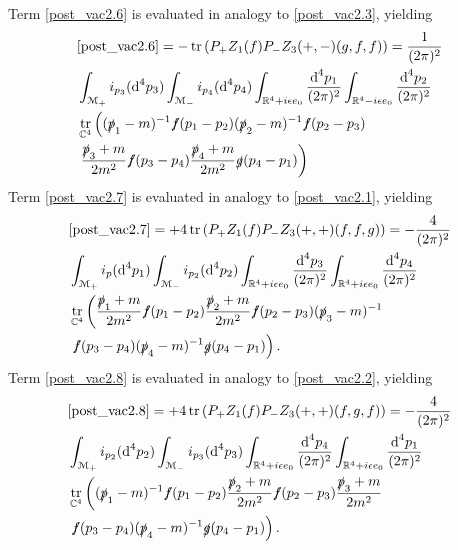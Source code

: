 \documentclass[oneside,reqno,12pt]{amsart}
\DeclareMathOperator{\tr}{tr}
\begin{document}
Term \eqref{post_vac2.6} is evaluated in analogy to \eqref{post_vac2.3}, yielding
\begin{align*}
&\eqref{post_vac2.6}=- \tr\left(P_+ Z_1(f)P_- Z_3(+,-)(g,f,f)\right)=\frac{1}{(2\pi)^2}\\
&\int_{\mathcal{M_+}}  i_{p_3}(\text{d}^4p_{3}) 
\int_{\mathcal{M_-}}  i_{p_4}(\text{d}^4p_{4})
\int_{\mathbb{R}^4+i \epsilon e_0}\frac{\text{d}^4p_1}{(2\pi)^{2}}
\int_{\mathbb{R}^4-i \epsilon e_0}\frac{\text{d}^4p_2}{(2\pi)^{2}}
 \\
&\tr_{\mathbb{C}^4}\left( (\slashed{p}_1-m)^{-1}  \slashed{f}(p_{1}-p_2)  (\slashed{p}_2-m)^{-1} \slashed{f}(p_{2}-p_{3})   \right.\\
&\left.  \frac{\slashed{p}_3+m}{2m^2} \slashed{f}(p_{3}-p_{4})
 \frac{\slashed{p}_{4}+m}{2m^2} 
\slashed{g}(p_{4}-p_1)  \right)
\end{align*}
Term \eqref{post_vac2.7} is evaluated in analogy to \eqref{post_vac2.1}, yielding
\begin{align*}
&\eqref{post_vac2.7}=+4 \tr\left(P_+ Z_1(f)P_- Z_3(+,+)(f,f,g)\right)=-\frac{4}{(2\pi)^2}\\
&\int_{\mathcal{M_+}}  i_p(\text{d}^4p_{1}) 
\int_{\mathcal{M_-}}  i_{p_2}(\text{d}^4p_{2})
\int_{\mathbb{R}^4+i \epsilon e_0}\frac{\text{d}^4p_3}{(2\pi)^{2}}
\int_{\mathbb{R}^4+i \epsilon e_0}\frac{\text{d}^4p_4}{(2\pi)^{2}}
 \\
&\tr_{\mathbb{C}^4}\left(\frac{\slashed{p}_1+m}{2m^2} \slashed{f}(p_{1}-p_{2})
 \frac{\slashed{p}_{2}+m}{2m^2} 
   \slashed{f}(p_{2}-p_3)  (\slashed{p}_3-m)^{-1} \right.
\\
&\left. \slashed{f}(p_{3}-p_4)  (\slashed{p}_4-m)^{-1} \slashed{g}(p_{4}-p_{1})\right)
.\end{align*}
Term \eqref{post_vac2.8} is evaluated in analogy to \eqref{post_vac2.2}, yielding
\begin{align*}
&\eqref{post_vac2.8}=+4 \tr\left(P_+ Z_1(f)P_- Z_3(+,+)(f,g,f)\right)=-\frac{4}{(2\pi)^2}\\
&\int_{\mathcal{M_+}}  i_{p_2}(\text{d}^4p_{2}) 
\int_{\mathcal{M_-}}  i_{p_3}(\text{d}^4p_{3})
\int_{\mathbb{R}^4+i \epsilon e_0}\frac{\text{d}^4p_4}{(2\pi)^{2}}
\int_{\mathbb{R}^4+i \epsilon e_0}\frac{\text{d}^4p_1}{(2\pi)^{2}}
 \\
&\tr_{\mathbb{C}^4}\left( (\slashed{p}_1-m)^{-1} \slashed{f}(p_{1}-p_{2})\frac{\slashed{p}_2+m}{2m^2} \slashed{f}(p_{2}-p_{3})
 \frac{\slashed{p}_{3}+m}{2m^2} \right.\\
&\left. \slashed{f}(p_{3}-p_4)  (\slashed{p}_4-m)^{-1} \slashed{g}(p_{4}-p_1)  \right)
.\end{align*}
\end{document}

